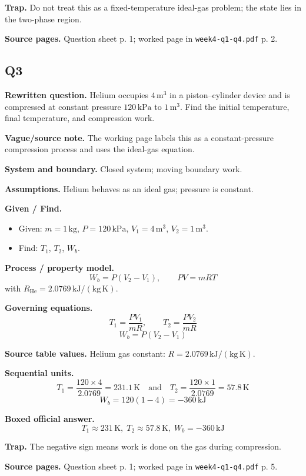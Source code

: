 \textbf{Trap.} Do not treat this as a fixed-temperature ideal-gas problem; the state lies in the two-phase region.

\textbf{Source pages.} Question sheet p. 1; worked page in \texttt{week4-q1-q4.pdf} p. 2.

\subsection*{Q3}
\textbf{Rewritten question.} Helium occupies $4\,\text{m}^3$ in a piston--cylinder device and is compressed at constant pressure $120\,\text{kPa}$ to $1\,\text{m}^3$. Find the initial temperature, final temperature, and compression work.

\textbf{Vague/source note.} The working page labels this as a constant-pressure compression process and uses the ideal-gas equation.

\textbf{System and boundary.} Closed system; moving boundary work.

\textbf{Assumptions.} Helium behaves as an ideal gas; pressure is constant.

\textbf{Given / Find.}
\begin{itemize}
  \item Given: $m=1\,\text{kg}$, $P=120\,\text{kPa}$, $V_1=4\,\text{m}^3$, $V_2=1\,\text{m}^3$.
  \item Find: $T_1$, $T_2$, $W_b$.
\end{itemize}

\textbf{Process / property model.}
\[
W_b=P(V_2-V_1),\qquad PV=mRT
\]
with $R_{\text{He}}=2.0769\,\mathrm{kJ/(kg\,K)}$.

\textbf{Governing equations.}
\[
T_1=\frac{P V_1}{mR},\qquad T_2=\frac{P V_2}{mR}
\]
\[
W_b=P(V_2-V_1)
\]

\textbf{Source table values.} Helium gas constant: $R=2.0769\,\mathrm{kJ/(kg\,K)}$.

\textbf{Sequential units.}
\[
T_1=\frac{120\times 4}{2.0769}=231.1\,\text{K}
\quad\text{and}\quad
T_2=\frac{120\times 1}{2.0769}=57.8\,\text{K}
\]
\[
W_b=120(1-4)=-360\,\text{kJ}
\]

\textbf{Boxed official answer.}
\[
\boxed{T_1\approx 231\,\text{K},\; T_2\approx 57.8\,\text{K},\; W_b=-360\,\text{kJ}}
\]

\textbf{Trap.} The negative sign means work is done on the gas during compression.

\textbf{Source pages.} Question sheet p. 1; worked page in \texttt{week4-q1-q4.pdf} p. 5.

